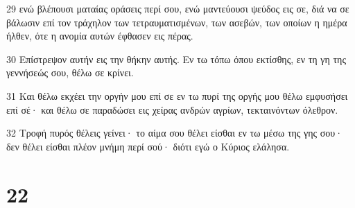 \par 29 ενώ βλέπουσι ματαίας οράσεις περί σου, ενώ μαντεύουσι ψεύδος εις σε, διά να σε βάλωσιν επί τον τράχηλον των τετραυματισμένων, των ασεβών, των οποίων η ημέρα ήλθεν, ότε η ανομία αυτών έφθασεν εις πέρας.
\par 30 Επίστρεψον αυτήν εις την θήκην αυτής. Εν τω τόπω όπου εκτίσθης, εν τη γη της γεννήσεώς σου, θέλω σε κρίνει.
\par 31 Και θέλω εκχέει την οργήν μου επί σε εν τω πυρί της οργής μου θέλω εμφυσήσει επί σέ· και θέλω σε παραδώσει εις χείρας ανδρών αγρίων, τεκταινόντων όλεθρον.
\par 32 Τροφή πυρός θέλεις γείνει· το αίμα σου θέλει είσθαι εν τω μέσω της γης σου· δεν θέλει είσθαι πλέον μνήμη περί σού· διότι εγώ ο Κύριος ελάλησα.

\chapter{22}

